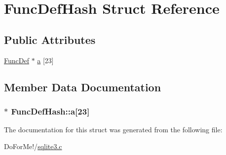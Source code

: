 \hypertarget{struct_func_def_hash}{\section{Func\-Def\-Hash Struct Reference}
\label{struct_func_def_hash}
}
\subsection*{Public Attributes}
\begin{DoxyCompactItemize}
\item 
\hyperlink{struct_func_def}{Func\-Def} $\ast$ \hyperlink{struct_func_def_hash_a3e044ccfe432770ef7297e86e405cc96}{a} \mbox{[}23\mbox{]}
\end{DoxyCompactItemize}


\subsection{Member Data Documentation}
\hypertarget{struct_func_def_hash_a3e044ccfe432770ef7297e86e405cc96}{
\subsubsection[{a}]{$\ast$ Func\-Def\-Hash\-::a\mbox{[}23\mbox{]}}}\label{struct_func_def_hash_a3e044ccfe432770ef7297e86e405cc96}


The documentation for this struct was generated from the following file\-:\begin{DoxyCompactItemize}
\item 
Do\-For\-Me!/\hyperlink{sqlite3_8c}{sqlite3.\-c}\end{DoxyCompactItemize}
